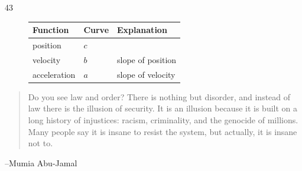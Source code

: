 \documentclass[letterpaper, landscape]{exam}
\begin{document}
\begin{description}
      \item[43]
        \begin{tabular}[H]{lll}
          \toprule
          Function     & Curve & Explanation \\
          \midrule
          position     & $c$   & \\
          velocity     & $b$   & slope of position \\
          acceleration & $a$   & slope of velocity \\
          \bottomrule
        \end{tabular}

     \end{description}
 
  \else
    \vspace{10 cm}
    \begin{quote}
      \begin{em}
        Do you see law and order? There is nothing but disorder, and instead of law there
        is the illusion of security. It is an illusion because it is built on a long
        history of injustices: racism, criminality, and the genocide of millions. Many
        people say it is insane to resist the system, but actually, it is insane not to. 
      \end{em}
    \end{quote}
    \hspace{2 cm} --Mumia Abu-Jamal
  \fi
\end{document}
